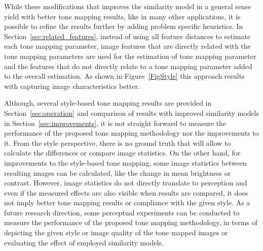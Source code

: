 While these modifications that improves the similarity model in a general sense yield with better tone mapping results, like in many other applications, it is possible to refine the results further by adding problem specific heuristics. In Section~\ref{sec:related_features}, instead of using all feature distances to estimate each tone mapping parameter, image features that are directly related with the tone mapping parameters are used for the estimation of tone mapping parameter and the features that do not directly relate to a tone mapping parameter added to the overall estimation. As shown in Figure~\ref{FigStyle} this approach results with capturing image characteristics better. 

Although, several style-based tone mapping results are provided in Section~\ref{sec:operation} and comparison of results with improved similarity models in Section~\ref{sec:improvements}, it is not straight forward to measure the performance of the proposed tone mapping methodology nor the improvements to it. From the style perspective, there is no ground truth that will allow to calculate the differences or compare image statistics. On the other hand, for improvements to the style-based tone mapping, some image statistics between resulting images can be calculated, like the change in mean brightness or contrast. However, image statistics do not directly translate to perception and even if the measured effects are also visible when results are compared, it does not imply better tone mapping results or compliance with the given style. As a future research direction, some perceptual experiments can be conducted to measure the performance of the proposed tone mapping methodology, in terms of depicting the given style or image quality of the tone mapped images or evaluating the effect of employed similarity models.  

